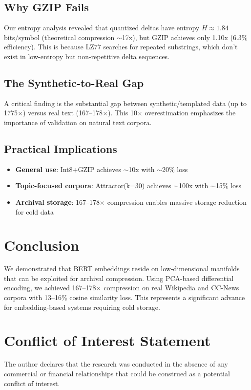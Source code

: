 \documentclass[utf8]{FrontiersinVancouver}
\begin{document}
\subsection{Why GZIP Fails}

Our entropy analysis revealed that quantized deltas have entropy $H \approx 1.84$ bits/symbol (theoretical compression $\sim$17x), but GZIP achieves only 1.10x (6.3\% efficiency). This is because LZ77 searches for repeated substrings, which don't exist in low-entropy but non-repetitive delta sequences.

\subsection{The Synthetic-to-Real Gap}

A critical finding is the substantial gap between synthetic/templated data (up to 1775$\times$) versus real text (167--178$\times$). This 10$\times$ overestimation emphasizes the importance of validation on natural text corpora.

\subsection{Practical Implications}

\begin{itemize}
\item \textbf{General use}: Int8+GZIP achieves $\sim$10x with $\sim$20\% loss
\item \textbf{Topic-focused corpora}: Attractor(k=30) achieves $\sim$100x with $\sim$15\% loss
\item \textbf{Archival storage}: 167--178$\times$ compression enables massive storage reduction for cold data
\end{itemize}

\section{Conclusion}

We demonstrated that BERT embeddings reside on low-dimensional manifolds that can be exploited for archival compression. Using PCA-based differential encoding, we achieved 167--178$\times$ compression on real Wikipedia and CC-News corpora with 13--16\% cosine similarity loss. This represents a significant advance for embedding-based systems requiring cold storage.

\section*{Conflict of Interest Statement}
The author declares that the research was conducted in the absence of any commercial or financial relationships that could be construed as a potential conflict of interest.
\end{document}
